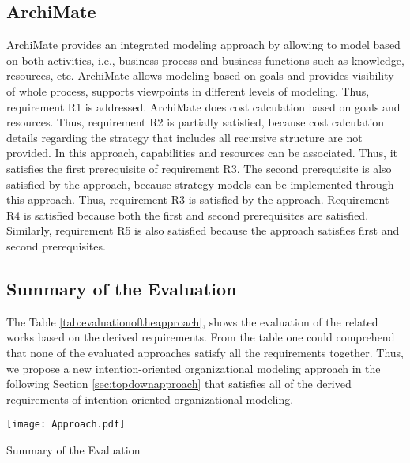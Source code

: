 \subsection{ArchiMate}
ArchiMate provides an integrated modeling approach by allowing to model based on both activities, i.e., business process and business functions such as knowledge, resources, etc. ArchiMate allows modeling based on goals and provides visibility of whole process, supports viewpoints in different levels of modeling. Thus, requirement R1 is addressed. ArchiMate does cost calculation based on goals and resources. Thus, requirement R2 is partially satisfied, because cost calculation details regarding the strategy that includes all recursive structure are not provided.  In this approach, capabilities and resources can be associated. Thus, it satisfies the first prerequisite of requirement R3. The second prerequisite is also satisfied by the approach, because strategy models can be implemented through this approach. Thus, requirement R3 is satisfied by the approach. Requirement R4 is satisfied because both the first and second prerequisites are satisfied. Similarly, requirement R5 is also satisfied because the approach satisfies first and second prerequisites.  

\subsection {Summary of the Evaluation}
 The Table \ref{tab:evaluationoftheapproach}, shows the evaluation of the related works based on the derived requirements. From the table one could comprehend that none of the evaluated approaches satisfy all the requirements together. Thus, we propose a new intention-oriented organizational modeling approach in the following Section \ref{sec:topdownapproach} that satisfies all of the derived requirements of intention-oriented organizational modeling. 

 \begin{table}
 	\centering
 	\texttt{[image: Approach.pdf]}
 	\caption{Summary of the Evaluation}
 	\label{tab:evaluationoftheapproach}
 \end{table} 


